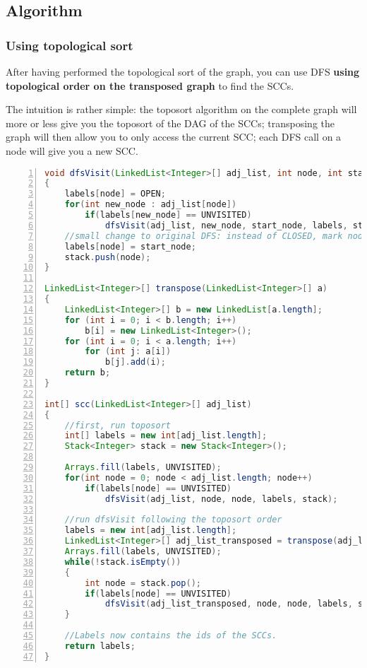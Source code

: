 \subsection{Algorithm}
\subsubsection{Using topological sort}
After having performed the topological sort of the graph, you can use DFS \textbf{using topological order on the transposed graph} to find the SCCs.

The intuition is rather simple: the toposort algorithm on the complete graph will more or less give you the toposort of the DAG of the SCCs; transposing the graph will then allow you to only access the current SCC; each DFS call on a node will give you a new SCC.

\begin{lstlisting}[label=code-scc1,caption=Toposort+DFS, language=Java, tabsize=2, breaklines=true, numbers=left]
void dfsVisit(LinkedList<Integer>[] adj_list, int node, int start_node, int[] labels, Stack<Integer> stack)
{
	labels[node] = OPEN;
	for(int new_node : adj_list[node])
		if(labels[new_node] == UNVISITED)
			dfsVisit(adj_list, new_node, start_node, labels, stack);
	//small change to original DFS: instead of CLOSED, mark nodes as the "start node"
	labels[node] = start_node;
	stack.push(node);
}

LinkedList<Integer>[] transpose(LinkedList<Integer>[] a)
{
	LinkedList<Integer>[] b = new LinkedList[a.length];
	for (int i = 0; i < b.length; i++)
		b[i] = new LinkedList<Integer>();
	for (int i = 0; i < a.length; i++)
		for (int j: a[i])
			b[j].add(i);
	return b;
}

int[] scc(LinkedList<Integer>[] adj_list)
{
	//first, run toposort
	int[] labels = new int[adj_list.length];
	Stack<Integer> stack = new Stack<Integer>();

	Arrays.fill(labels, UNVISITED);
	for(int node = 0; node < adj_list.length; node++)
		if(labels[node] == UNVISITED)
			dfsVisit(adj_list, node, node, labels, stack);

	//run dfsVisit following the toposort order
	labels = new int[adj_list.length];
	LinkedList<Integer>[] adj_list_transposed = transpose(adj_list);
	Arrays.fill(labels, UNVISITED);
	while(!stack.isEmpty())
	{
		int node = stack.pop();
		if(labels[node] == UNVISITED)
			dfsVisit(adj_list_transposed, node, node, labels, stack);
	}

	//Labels now contains the ids of the SCCs.
	return labels;
}
\end{lstlisting}

